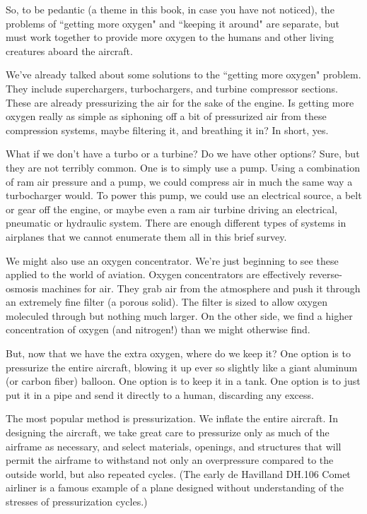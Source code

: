 So, to be pedantic (a theme in this book, in case you have not noticed), the problems of ``getting more oxygen" and ``keeping it around" are separate, but must work together to provide more oxygen to the humans and other living creatures aboard the aircraft.

We've already talked about some solutions to the ``getting more oxygen" problem. They include superchargers, turbochargers, and turbine compressor sections. These are already pressurizing the air for the sake of the engine. Is getting more oxygen really as simple as siphoning off a bit of pressurized air from these compression systems, maybe filtering it, and breathing it in? In short, yes.

What if we don't have a turbo or a turbine? Do we have other options? Sure, but they are not terribly common. One is to simply use a pump. Using a combination of ram air pressure and a pump, we could compress air in much the same way a turbocharger would. To power this pump, we could use an electrical source, a belt or gear off the engine, or maybe even a ram air turbine driving an electrical, pneumatic or hydraulic system. There are enough different types of systems in airplanes that we cannot enumerate them all in this brief survey.

We might also use an oxygen concentrator. We're just beginning to see these applied to the world of aviation. Oxygen concentrators are effectively reverse-osmosis machines for air. They grab air from the atmosphere and push it through an extremely fine filter (a porous solid). The filter is sized to allow oxygen moleculed through but nothing much larger. On the other side, we find a higher concentration of oxygen (and nitrogen!) than we might otherwise find.

But, now that we have the extra oxygen, where do we keep it? One option is to pressurize the entire aircraft, blowing it up ever so slightly like a giant aluminum (or carbon fiber) balloon. One option is to keep it in a tank. One option is to just put it in a pipe and send it directly to a human, discarding any excess.

The most popular method is pressurization. We inflate the entire aircraft. In designing the aircraft, we take great care to pressurize only as much of the airframe as necessary, and select materials, openings, and structures that will permit the airframe to withstand not only an overpressure compared to the outside world, but also repeated cycles. (The early de Havilland DH.106 Comet airliner is a famous example of a plane designed without understanding of the stresses of pressurization cycles.)

